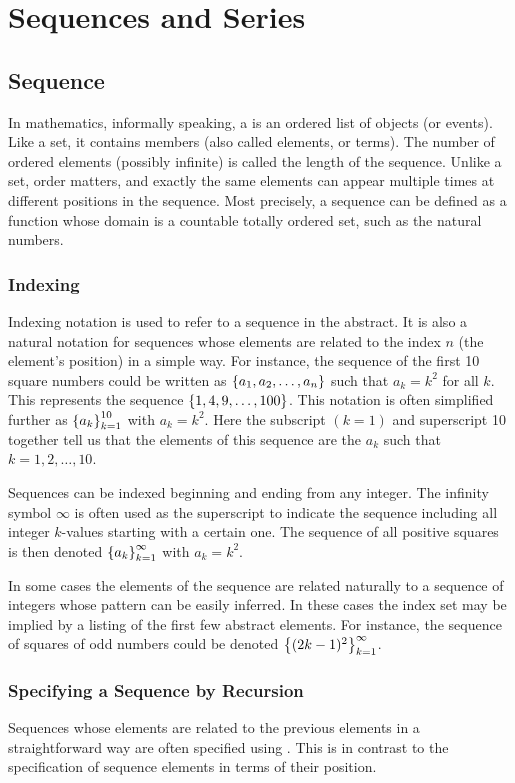 \section{Sequences and Series}

\subsection{Sequence}
In mathematics, informally speaking, a  is an ordered list of objects (or events). Like a set, it contains members (also called elements, or terms). The number of ordered elements (possibly infinite) is called the length of the sequence. Unlike a set, order matters, and exactly the same elements can appear multiple times at different positions in the sequence. Most precisely, a sequence can be defined as a function whose domain is a countable totally ordered set, such as the natural numbers.

\subsubsection{Indexing} 
Indexing notation is used to refer to a sequence in the abstract. It is also a natural notation for sequences whose elements are related to the index $n$ (the element's position) in a simple way. For instance, the sequence of the first 10 square numbers could be written as $\left\lbrace{a_1, a_2, \dotsc, a_n}\right\rbrace$ such that $a_k = k^2$ for all $k$. This represents the sequence $\left\lbrace{1,4,9,\dotsc, 100}\right\rbrace$. This notation is often simplified further as $\left\lbrace{{a_k}}\right\rbrace_{k=1}^{10}$ with $a_k = k^2$. Here the subscript $(k=1)$ and superscript 10 together tell us that the elements of this sequence are the $a_k$ such that $k=1,2,\dotsc,10$.

Sequences can be indexed beginning and ending from any integer. The infinity symbol $\infty$ is often used as the superscript to indicate the sequence including all integer $k$-values starting with a certain one. The sequence of all positive squares is then denoted $\left\lbrace{{a_k}}\right\rbrace_{k=1}^{\infty}$ with $a_k = k^2$.

In some cases the elements of the sequence are related naturally to a sequence of integers whose pattern can be easily inferred. In these cases the index set may be implied by a listing of the first few abstract elements. For instance, the sequence of squares of odd numbers could be denoted $\left\lbrace{{(2k-1)^2}}\right\rbrace_{k=1}^{\infty}$.


\subsubsection{Specifying a Sequence by Recursion}
Sequences whose elements are related to the previous elements in a straightforward way are often specified using . This is in contrast to the specification of sequence elements in terms of their position.


